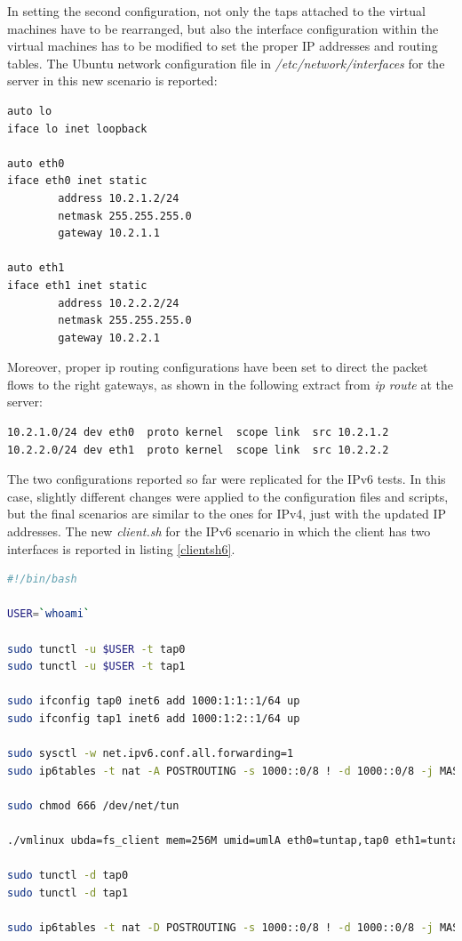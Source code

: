 In setting the second configuration, not only the taps attached to the virtual machines have to be rearranged, but also the interface configuration within the virtual machines has to be modified to set the proper IP addresses and routing tables. The Ubuntu network configuration file in \textit{/etc/network/interfaces} for the server in this new scenario is reported:

\begin{verbatim}
auto lo
iface lo inet loopback

auto eth0
iface eth0 inet static
        address 10.2.1.2/24
        netmask 255.255.255.0
        gateway 10.2.1.1

auto eth1
iface eth1 inet static
        address 10.2.2.2/24
        netmask 255.255.255.0
        gateway 10.2.2.1
\end{verbatim}

Moreover, proper ip routing configurations have been set to direct the packet flows to the right gateways, as shown in the following extract from \textit{ip route} at the server:

\begin{verbatim}
10.2.1.0/24 dev eth0  proto kernel  scope link  src 10.2.1.2 
10.2.2.0/24 dev eth1  proto kernel  scope link  src 10.2.2.2 
\end{verbatim}
 
The two configurations reported so far were replicated for the IPv6 tests. In this case, slightly different changes were applied to the configuration files and scripts, but the final scenarios are similar to the ones for IPv4, just with the updated IP addresses. The new \textit{client.sh} for the IPv6 scenario in which the client has two interfaces is reported in listing \ref{clientsh6}.

\begin{lstlisting}[language=bash, caption=\textit{client.sh for IPv6 setup}, label=clientsh6]
#!/bin/bash

USER=`whoami`

sudo tunctl -u $USER -t tap0
sudo tunctl -u $USER -t tap1

sudo ifconfig tap0 inet6 add 1000:1:1::1/64 up
sudo ifconfig tap1 inet6 add 1000:1:2::1/64 up

sudo sysctl -w net.ipv6.conf.all.forwarding=1
sudo ip6tables -t nat -A POSTROUTING -s 1000::0/8 ! -d 1000::0/8 -j MASQUERADE

sudo chmod 666 /dev/net/tun

./vmlinux ubda=fs_client mem=256M umid=umlA eth0=tuntap,tap0 eth1=tuntap,tap1

sudo tunctl -d tap0
sudo tunctl -d tap1

sudo ip6tables -t nat -D POSTROUTING -s 1000::0/8 ! -d 1000::0/8 -j MASQUERADE
\end{lstlisting}

